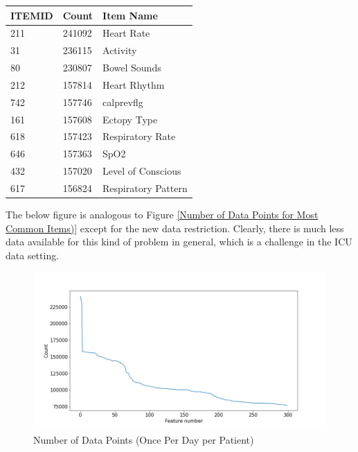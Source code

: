 \documentclass[12pt]{article}
\begin{document}
\begin{center}
\captionsetup{type=table}
\begin{tabular}{|l|l|l|}
\hline
ITEMID & Count  & Item Name           \\ \hline
211    & 241092 & Heart Rate          \\ \hline
31     & 236115 & Activity            \\ \hline
80     & 230807 & Bowel Sounds        \\ \hline
212    & 157814 & Heart Rhythm        \\ \hline
742    & 157746 & calprevflg          \\ \hline
161    & 157608 & Ectopy Type         \\ \hline
618    & 157423 & Respiratory Rate    \\ \hline
646    & 157363 & SpO2                \\ \hline
432    & 157020 & Level of Conscious  \\ \hline
617    & 156824 & Respiratory Pattern \\ \hline
\end{tabular}
\label{Most Common Items (Once per Day per Patient)}
\end{center}

The below figure is analogous to Figure \ref{Number of Data Points for Most Common Items)} except for the new data restriction. Clearly, there is much less data available for this kind of problem in general, which is a challenge in the ICU data setting.

\begin{figure}[H]
\centering\caption{Number of Data Points (Once Per Day per Patient)}
\includegraphics[scale=0.45]{Number of Data Points (Once Per Day per Patient).png}
\end{figure}
\end{document}
